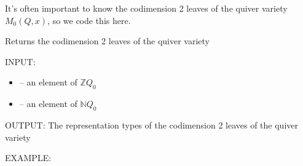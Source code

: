 \documentclass[letterpaper,10pt,english]{sphinxmanual}
\begin{document}
\sphinxAtStartPar
It’s often important to know the codimension 2 leaves of the quiver variety \(M_0(Q,x)\), so we code this here.

\begin{fulllineitems}
\label{\detokenize{index:quivercombinatorics.quivercombinatorics.Quiver.codimension_two_leaves}}
\pysigstartsignatures
\pysiglinewithargsret
{}
{\sphinxparamcomma {}}
{}
\pysigstopsignatures
\sphinxAtStartPar
Returns the codimension 2 leaves of the quiver variety

\sphinxAtStartPar
INPUT:
\begin{itemize}
\item {} 
\sphinxAtStartPar
{} – an element of \(\mathbb{Z}Q_0\)

\item {} 
\sphinxAtStartPar
{} – an element of \(\mathbb{N}Q_0\)

\end{itemize}

\sphinxAtStartPar
OUTPUT: The representation types of the codimension 2 leaves of the quiver variety

\sphinxAtStartPar
EXAMPLE:


\end{fulllineitems}
\end{document}
